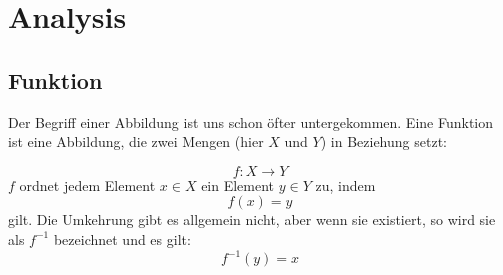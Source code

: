 \part{Analysis}


\chapter{Funktion}

Der Begriff einer Abbildung ist uns schon öfter untergekommen. Eine Funktion ist eine Abbildung, die zwei Mengen (hier $X$ und $Y$) in Beziehung setzt:

\[ f: X \longrightarrow Y \]
$f$ ordnet jedem Element $x\in X$ ein Element $y\in Y$ zu, indem
\[f(x) =y\]
gilt. Die Umkehrung gibt es allgemein nicht, aber wenn sie existiert, so wird sie als $f^{-1}$ bezeichnet und es gilt:
\[ f^{-1}(y) =x\]


